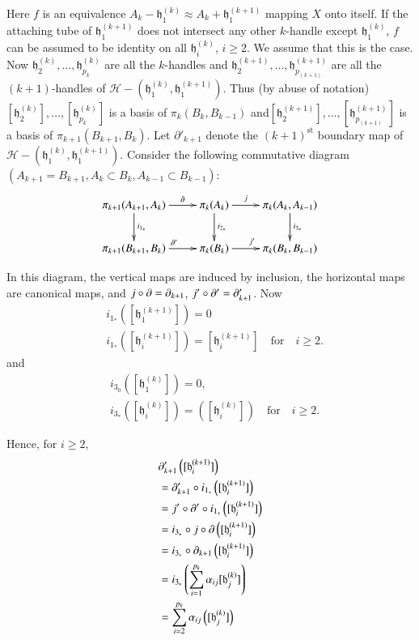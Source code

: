 Here $f$ is an equivalence $A_{k}-\mathfrak{h}^{(k)}_{1}\approx A_{k}+\mathfrak{h}^{(k+1)}_{1}$ mapping $X$ onto itself. If the attaching tube of $\mathfrak{h}^{(k+1)}_{1}$ does not intersect any other $k$-handle except $\mathfrak{h}^{(k)}_{1}$, $f$ can be assumed to be identity on all $\mathfrak{h}^{(k)}_{i}$, $i\geq 2$. We assume that this is the case. Now $\mathfrak{h}^{(k)}_{2},\ldots,\mathfrak{h}^{(k)}_{p_{k}}$ are all the $k$-handles and $\mathfrak{h}^{(k+1)}_{2},\ldots,\mathfrak{h}^{(k+1)}_{p_{(k+1)}}$ are all the $(k+1)$-handles of $\mathscr{H}-(\mathfrak{h}^{(k)}_{1},\mathfrak{h}^{(k+1)}_{1})$. Thus (by abuse of notation) $[\mathfrak{h}^{(k)}_{2}],\ldots,[\mathfrak{h}^{(k)}_{p_{k}}]$ is a basis of $\pi_{k}(B_{k},B_{k-1})$ and\pageoriginale $[\mathfrak{h}^{(k+1)}_{2}],\ldots,[\mathfrak{h}^{(k+1)}_{p_{(k+1)}}]$ is a basis of $\pi_{k+1}(B_{k+1},B_{k})$. Let $\partial'_{k+1}$ denote the $(k+1)^{\text{st}}$ boundary map of $\mathscr{H}-(\mathfrak{h}^{(k)}_{1},\mathfrak{h}^{(k+1)}_{1})$. Consider the following commutative diagram $(A_{k+1}=B_{k+1},A_{k}\subset B_{k},A_{k-1}\subset B_{k-1})$: 
\[
\xymatrix{
\pi_{k+1}(A_{k+1},A_{k})\ar[d]^{i_{1_{\ast}}}\ar[r]^-{\p} & \pi_{k}(A_{k})\ar[d]^{i_{2_{\ast}}}\ar[r]^-{j} & \pi_{k}(A_{k},A_{k-1})\ar[d]^{i_{3_{\ast}}}\\
\pi_{k+1}(B_{k+1},B_{k})\ar[r]^{\p'} & \pi_{k}(B_{k})\ar[r]^{j'} & \pi_{k}(B_{k},B_{k-1})
}
\]

In this diagram, the vertical maps are induced by inclusion, the horizontal maps are canonical maps, and $j\circ \partial =\partial_{k+1}$, $j'\circ\partial'=\partial'_{k+1}$. Now
\begin{align*}
& i_{1_{\ast}}\left([\mathfrak{h}^{(k+1)}_{1}]\right)=0\\
& i_{1_{\ast}}\left([\mathfrak{h}^{(k+1)}_{i}]\right)=[\mathfrak{h}_{i}^{(k+1)}]\quad\text{for}\quad i\geq 2.
\end{align*}
and 
\begin{align*}
& i_{3_{0}}\left([\mathfrak{h}^{(k)}_{1}]\right)=0,\\
& i_{3_{\ast}}\left([\mathfrak{h}^{(k)}_{i}]\right)=\left([\mathfrak{h}^{(k)}_{i}]\right)\quad\text{for}\quad i\geq 2.
\end{align*}

Hence, for $i\geq 2$,
\begin{align*}
& \partial'_{k+1}\left([\mathfrak{h}^{(k+1)}_{i}]\right)\\
&=\partial'_{k+1}\circ i_{1_{\ast}}\left([\mathfrak{h}^{(k+1)}_{i}]\right)\\
&=j'\circ \partial'\circ i_{1_{\ast}}\left([\mathfrak{h}^{(k+1)}_{i}]\right)\\
&=i_{3_{\ast}}\circ j\circ \partial\left([\mathfrak{h}^{(k+1)}_{i}]\right)\\
&= i_{3_{\ast}}\circ \partial_{k+1}\left([\mathfrak{h}^{(k+1)}_{i}]\right)\\
&= i_{3_{\ast}}\left(\sum^{p_{k}}_{i=1}\alpha_{ij}[\mathfrak{h}^{(k)}_{j}]\right)\\
&= \sum^{p_{k}}_{i=2}\alpha_{ij}\left([\mathfrak{h}^{(k)}_{j}]\right)
\end{align*}\pageoriginale 

